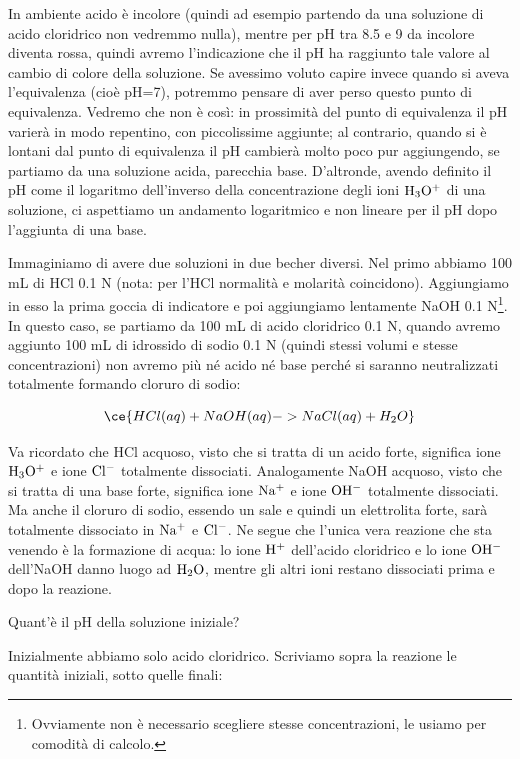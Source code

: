 In ambiente acido è incolore (quindi ad esempio partendo da una soluzione di acido cloridrico non vedremmo nulla), mentre per pH tra 8.5 e 9 da incolore diventa rossa, quindi avremo l'indicazione che il pH ha raggiunto tale valore al cambio di colore della soluzione. Se avessimo voluto capire invece quando si aveva l'equivalenza (cioè pH=7), potremmo pensare di aver perso questo punto di equivalenza. Vedremo che non è così: in prossimità del punto di equivalenza il pH varierà in modo repentino, con piccolissime aggiunte; al contrario, quando si è lontani dal punto di equivalenza il pH cambierà molto poco pur aggiungendo, se partiamo da una soluzione acida, parecchia base. D'altronde, avendo definito il pH come il logaritmo dell'inverso della concentrazione degli ioni $\rm H_3O^+$ di una soluzione, ci aspettiamo un andamento logaritmico e non lineare per il pH dopo l'aggiunta di una base.

\vspace{0.2cm}Immaginiamo di avere due soluzioni in due becher diversi. Nel primo abbiamo 100 mL di HCl 0.1 N (nota: per l'HCl normalità e molarità coincidono). Aggiungiamo in esso la prima goccia di indicatore e poi aggiungiamo lentamente NaOH 0.1 N\footnote{Ovviamente non è necessario scegliere stesse concentrazioni, le usiamo per comodità di calcolo.}. In questo caso, se partiamo da 100 mL di acido cloridrico 0.1 N, quando avremo aggiunto 100 mL di idrossido di sodio 0.1 N (quindi stessi volumi e stesse concentrazioni) non avremo più né acido né base perché si saranno neutralizzati totalmente formando cloruro di sodio:

$$\ce{HCl(aq) + NaOH(aq) -> NaCl(aq) + H_2O}$$

Va ricordato che HCl acquoso, visto che si tratta di un acido forte, significa ione $\rm H_3O^+$ e ione $\rm Cl^-$ totalmente dissociati. Analogamente NaOH acquoso, visto che si tratta di una base forte, significa ione $\rm Na^+$ e ione $\rm OH^-$ totalmente dissociati. Ma anche il cloruro di sodio, essendo un sale e quindi un elettrolita forte, sarà totalmente dissociato in $\rm Na^+$ e $\rm Cl^-$. Ne segue che l'unica vera reazione che sta venendo è la formazione di acqua: lo ione $\rm H^+$ dell'acido cloridrico e lo ione $\rm OH^-$ dell'NaOH danno luogo ad $\rm H_2O$, mentre gli altri ioni restano dissociati prima e dopo la reazione.

Quant'è il pH della soluzione iniziale?

Inizialmente abbiamo solo acido cloridrico. Scriviamo sopra la reazione le quantità iniziali, sotto quelle finali:

